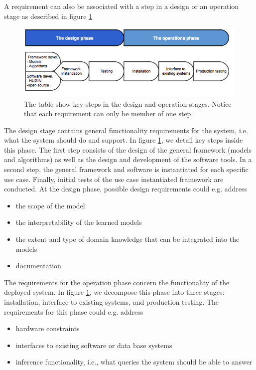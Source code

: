 \documentclass[11pt, oneside]{article}   	%
\begin{document}
A requirement can also be associated with a step in a design or an operation stage as described in figure \ref{REprocess2}

\begin{figure}
\centering
\includegraphics [keepaspectratio,width = 14cm] {REprocess2}
\caption{The table show key steps in the design and operation stages. Notice that each requirement can only be member of one step.}
\label{REprocess2}
\end{figure}

The design stage contains general functionality requirements for the system, i.e. what the system should do and support.  In figure \ref{REprocess2}, we detail key steps inside this phase. The first step consists of the design of the general framework (models and algorithms) as well as the design and development of the software tools. In a second step, the general framework and software is instantiated for each specific use case. Finally, initial tests of the use case instantiated framework are conducted.  At the design phase, possible design requirements could e.g. address
\begin{itemize}
 \item the scope of the model
 \item the interpretability of the learned models
 \item the extent and type of domain knowledge that can be integrated into the models
 \item documentation
\end{itemize}

The requirements for the operation phase concern the functionality of the deployed system. In figure \ref{REprocess2}, we decompose this phase into three stages: installation, interface to existing systems, and production testing. The requirements for this phase could e.g. address
\begin{itemize}
 \item hardware constraints
 \item interfaces to existing software or data base systems
 \item inference functionality, i.e., what queries the system should be able to answer
\end{itemize}
\end{document}
